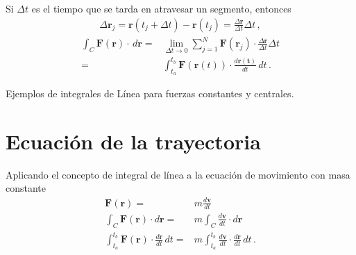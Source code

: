 Si $\Delta t$ es el tiempo que se tarda en atravesar un segmento, entonces
\begin{align}
  \Delta\mathbf{r}_j = \mathbf{r}(t_j+\Delta t)-\mathbf{r}(t_j)=\frac{\Delta\mathbf{r}}{\Delta t}\Delta t\,,
\end{align}
\begin{align}
  \int_C \mathbf{F}(\mathbf{r})\cdot\,d\mathbf{r}=&\lim_{\Delta t\to 0}\sum_{j=1}^N\mathbf{F}(\mathbf{r}_j)\cdot\frac{\Delta\mathbf{r}}{\Delta t}\Delta t\nonumber\\
=&\int_{t_a}^{t_b}\mathbf{F}(\mathbf{r}(t))\cdot\frac{d\mathbf{r(t)}}{dt}\,dt\,.
\end{align}
\begin{inprogress}
  Ejemplos de integrales de Línea para fuerzas constantes y centrales.
\end{inprogress}


\section{Ecuación de la trayectoria}

Aplicando el concepto de integral de línea a la ecuación de movimiento con masa constante
\begin{align}
\label{eq:trayectoria}
  \mathbf{F}(\mathbf{r})=&m\frac{d\mathbf{v}}{dt}\nonumber\\
  \int_C\mathbf{F}(\mathbf{r})\cdot d\mathbf{r}=&m\int_C\frac{d\mathbf{v}}{dt}\cdot d\mathbf{r}\nonumber\\
 \int_{t_a}^{t_b}\mathbf{F}(\mathbf{r})\cdot \frac{d\mathbf{r}}{dt}\,dt=&m\int_{t_a}^{t_b}\frac{d\mathbf{v}}{dt}\cdot \frac{d\mathbf{r}}{dt}\,dt\,.
\end{align}

